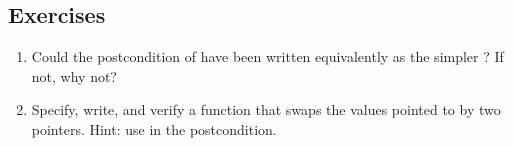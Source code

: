 \subsection*{Exercises}
\begin{enumerate}
\item
Could the postcondition of  have been written equivalently
as the simpler ? If not, why not?
\item
Specify, write, and verify a function that swaps the values pointed to
by two  pointers. Hint: use  in the postcondition.
\end{enumerate}


